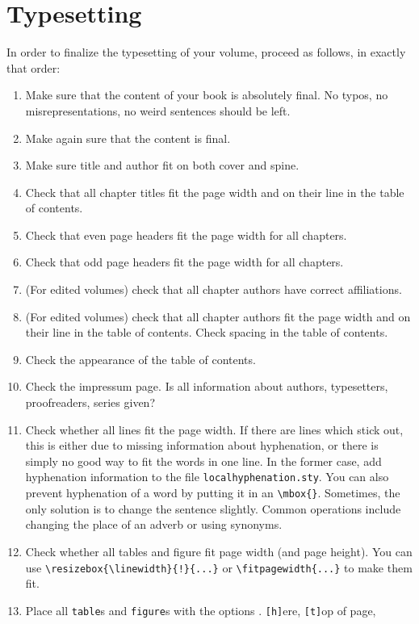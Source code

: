 \chapter{Typesetting}
In order to finalize the typesetting of your volume, proceed as follows, in exactly that order:

\begin{enumerate}
 \item Make sure that the content of your book is absolutely final. No typos, no misrepresentations, no weird sentences should be left.
 \item Make again sure that the content is final. 
 \item Make sure title and author fit on both cover and spine. 
 \item Check that all chapter titles fit the page width and on their line in the table of contents. 
 \item Check that even page headers fit the page width for all chapters.
 \item Check that odd page headers fit the page width for all chapters.
 \item (For edited volumes) check that all chapter authors have correct affiliations.
 \item (For edited volumes) check that all chapter authors fit the page width and on their line in the table of contents. Check spacing in the table of contents. 
 \item Check the appearance of the table of contents.
 \item Check the impressum page. Is all information about authors, typesetters, proofreaders, series given?
 \item Check whether all lines fit the page width. If there are lines which stick out, this is either due to missing information about hyphenation, or there is simply no good way to fit the words in one line. In the former case, add hyphenation information to the file \verb+localhyphenation.sty+. You can also prevent hyphenation of a word by putting it in an \verb+\mbox{}+. Sometimes, the only solution is to change the sentence slightly. Common operations include changing the place of an adverb or using synonyms.
 \item Check whether all tables and figure fit page width (and page height). You can use \verb+\resizebox{\linewidth}{!}{...}+ or \verb+\fitpagewidth{...}+  to make them fit.
 \item Place all \verb+table+s and \verb+figure+s with the options .
\texttt{[h]}ere, 
\texttt{[t]}op of page, 

\end{enumerate}
